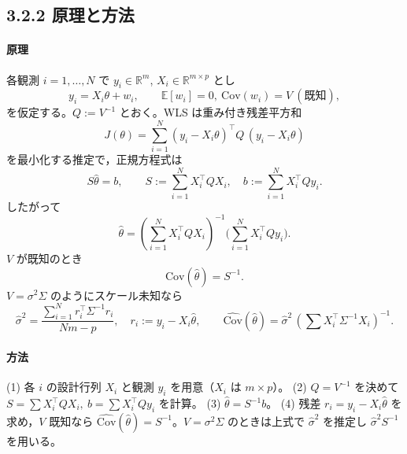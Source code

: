 \subsection{3.2.2 原理と方法}

\paragraph{原理}
各観測 $i=1,\dots,N$ で $y_i\in\mathbb{R}^m$, $X_i\in\mathbb{R}^{m\times p}$ とし
\[
y_i = X_i\theta + w_i,\qquad \mathbb{E}[w_i]=0,\ \mathrm{Cov}(w_i)=V\ (\text{既知}), 
\]
を仮定する。$Q:=V^{-1}$ とおく。WLS は重み付き残差平方和
\[
J(\theta)=\sum_{i=1}^N (y_i-X_i\theta)^\top Q\,(y_i-X_i\theta)
\]
を最小化する推定で，正規方程式は
\[
S\hat\theta=b,\qquad 
S:=\sum_{i=1}^N X_i^\top QX_i,\quad 
b:=\sum_{i=1}^N X_i^\top Qy_i.
\]
したがって
\[
\hat\theta=(\sum_{i=1}^N X_i^\top QX_i)^{-1}\Big(\sum_{i=1}^N X_i^\top Qy_i\Big).
\]
$V$ が既知のとき
\[
\mathrm{Cov}(\hat\theta)=S^{-1}.
\]
$V=\sigma^2\Sigma$ のようにスケール未知なら
\[
\hat\sigma^2=\frac{\sum_{i=1}^N r_i^\top \Sigma^{-1} r_i}{Nm-p},\quad r_i:=y_i-X_i\hat\theta,\qquad
\widehat{\mathrm{Cov}}(\hat\theta)=\hat\sigma^2\,(\sum X_i^\top \Sigma^{-1}X_i)^{-1}.
\]

\paragraph{方法}
(1) 各 $i$ の設計行列 $X_i$ と観測 $y_i$ を用意（$X_i$ は $m\times p$）。  
(2) $Q=V^{-1}$ を決めて $S=\sum X_i^\top QX_i,\ b=\sum X_i^\top Qy_i$ を計算。  
(3) $\hat\theta=S^{-1}b$。  
(4) 残差 $r_i=y_i-X_i\hat\theta$ を求め，$V$ 既知なら $\widehat{\mathrm{Cov}}(\hat\theta)=S^{-1}$。$V=\sigma^2\Sigma$ のときは上式で $\hat\sigma^2$ を推定し $\hat\sigma^2 S^{-1}$ を用いる。

